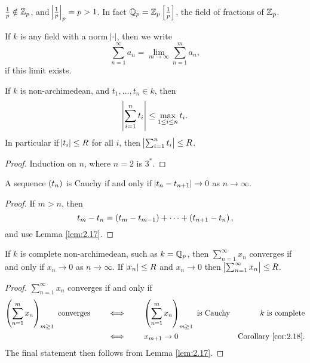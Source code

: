 \begin{note*}
$ \tfrac{1}{p} \notin \mathbb{Z}_p $, and $ \abs{\tfrac{1}{p}}_p = p > 1 $. In fact $ \QQ_p = \ZZ_p\sbr{\tfrac{1}{p}} $, the field of fractions of $ \mathbb{Z}_p $.
\end{note*}

\begin{definition}
If $ k $ is any field with a norm $ \abs{\cdot} $, then we write
$$ \sum_{n = 1}^\infty a_n = \lim_{m \to \infty} \sum_{n = 1}^m a_n, $$
if this limit exists.
\end{definition}

\begin{lemma}
\label{lem:2.17}
If $ k $ is non-archimedean, and $ t_1, \dots, t_n \in k $, then
$$ \abs{\sum_{i = 1}^n t_i} \le \max_{1 \le i \le n} t_i. $$
In particular if $ \abs{t_i} \le R $ for all $ i $, then $ \abs{\sum_{i = 1}^n t_i} \le R $.
\end{lemma}

\begin{proof}
Induction on $ n $, where $ n = 2 $ is $ 3^* $.
\end{proof}

\begin{corollary}
\label{cor:2.18}
A sequence $ \br{t_n} $ is Cauchy if and only if $ \abs{t_n - t_{n + 1}} \to 0 $ as $ n \to \infty $.
\end{corollary}

\begin{proof}
If $ m > n $, then
$$ t_m - t_n = \br{t_m - t_{m - 1}} + \dots + \br{t_{n + 1} - t_n}, $$
and use Lemma \ref{lem:2.17}.
\end{proof}

\pagebreak

\begin{lemma}
If $ k $ is complete non-archimedean, such as $ k = \mathbb{Q}_p $, then $ \sum_{n = 1}^\infty x_n $ converges if and only if $ x_n \to 0 $ as $ n \to \infty $. If $ \abs{x_n} \le R $ and $ x_n \to 0 $ then $ \abs{\sum_{n = 1}^\infty x_n} \le R $.
\end{lemma}

\begin{proof}
$ \sum_{n = 1}^\infty x_n $ converges if and only if
\begin{align*}
\br{\sum_{n = 1}^m x_n}_{m \ge 1} \ \text{converges} \qquad
& \iff \qquad \br{\sum_{n = 1}^m x_n}_{m \ge 1} \ \text{is Cauchy} & k \ \text{is complete} \\
& \iff \qquad x_{m + 1} \to 0 & \text{Corollary \ref{cor:2.18}}.
\end{align*}
The final statement then follows from Lemma \ref{lem:2.17}.
\end{proof}

